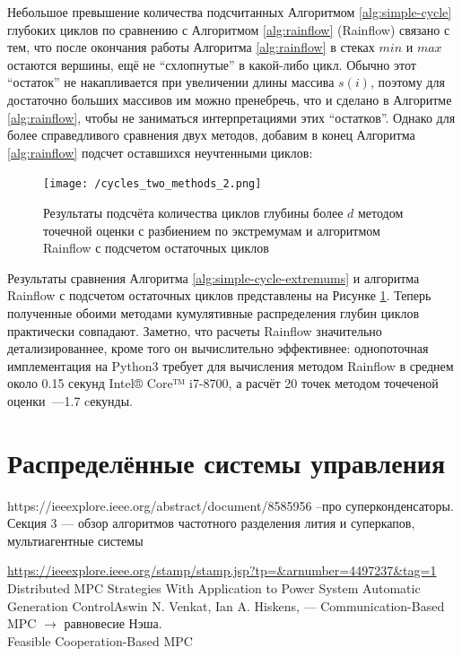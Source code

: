 \documentclass{report}
\begin{document}
Небольшое превышение количества подсчитанных Алгоритмом \ref{alg:simple-cycle} глубоких циклов по сравнению с Алгоритмом \ref{alg:rainflow} (Rainflow) связано с тем, что после окончания работы Алгоритма \ref{alg:rainflow} в стеках $min$ и $max$ остаются вершины, ещё не ``схлопнутые'' в какой-либо цикл. 
Обычно этот ``остаток'' не накапливается при увеличении длины массива $s(i)$, поэтому для достаточно больших массивов им можно пренебречь, что и сделано в Алгоритме \ref{alg:rainflow}, чтобы не заниматься интерпретациями этих ``остатков''.
Однако для более справедливого сравнения двух методов, добавим в конец  Алгоритма \ref{alg:rainflow} подсчет оставшихся неучтенными циклов:
\begin{algorithmic}
\EndWhile
\end{algorithmic}


\begin{figure}[h]
\texttt{[image: /cycles\_two\_methods\_2.png]}
\caption{Результаты подсчёта количества циклов глубины более $d$ методом точечной оценки с разбиением по экстремумам и алгоритмом Rainflow с подсчетом остаточных циклов}
\centering
\label{fig:cycles-two-methods-2}
\end{figure}

Результаты сравнения Алгоритма \ref{alg:simple-cycle-extremums} и алгоритма Rainflow с подсчетом остаточных циклов представлены на Рисунке \ref{fig:cycles-two-methods-2}.
Теперь полученные обоими методами кумулятивные распределения глубин циклов практически совпадают.
Заметно, что расчеты Rainflow значительно детализированнее, кроме того он вычислительно эффективнее: однопоточная имплементация на Python3 требует для вычисления методом Rainflow в среднем около 0.15 секунд Intel® Core™ i7-8700, а расчёт 20 точек методом точеченой оценки~---1.7 cекунды.

\chapter{Распределённые системы управления}

https://ieeexplore.ieee.org/abstract/document/8585956 --про суперконденсаторы.
 Секция 3 --- обзор алгоритмов частотного разделения лития и суперкапов, мультиагентные системы

\url{https://ieeexplore.ieee.org/stamp/stamp.jsp?tp=&arnumber=4497237&tag=1}
Distributed MPC Strategies With Application to Power System Automatic Generation ControlAswin N. Venkat,  Ian A. Hiskens, 
--- Communication-Based MPC $\rightarrow$ равновесие Нэша.\\
Feasible Cooperation-Based MPC
\end{document}
